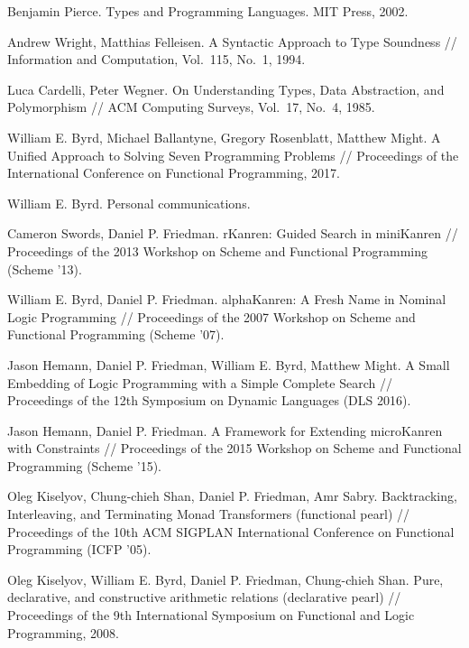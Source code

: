 \documentclass{llncs}
\begin{document}
\begin{thebibliography}{99}
Benjamin Pierce. Types and Programming Languages. MIT Press, 2002.

Andrew Wright, Matthias Felleisen. A Syntactic Approach to Type Soundness // Information and Computation, Vol.~115, No.~1, 1994.

Luca Cardelli, Peter Wegner. On Understanding Types, Data Abstraction, and Polymorphism // ACM Computing Surveys, Vol.~17, No.~4, 1985.

William E. Byrd, Michael Ballantyne, Gregory Rosenblatt, Matthew Might. A Unified Approach to Solving Seven Programming Problems // 
Proceedings of the International Conference on Functional Programming, 2017.

William E. Byrd. Personal communications.

Cameron Swords, Daniel P. Friedman. rKanren: Guided Search in miniKanren //
Proceedings of the 2013 Workshop on Scheme and Functional Programming (Scheme '13). 

William E. Byrd, Daniel P. Friedman. alphaKanren: A Fresh Name in Nominal Logic Programming //
Proceedings of the 2007 Workshop on Scheme and Functional Programming (Scheme '07).

Jason Hemann, Daniel P. Friedman, William E. Byrd, Matthew Might.
A Small Embedding of Logic Programming with a Simple Complete Search //
Proceedings of the 12th Symposium on Dynamic Languages (DLS 2016).

Jason Hemann, Daniel P. Friedman. A Framework for Extending microKanren with Constraints //
Proceedings of the 2015 Workshop on Scheme and Functional Programming (Scheme '15).

Oleg Kiselyov, Chung-chieh Shan, Daniel P. Friedman, Amr Sabry. Backtracking, Interleaving, and Terminating Monad Transformers (functional pearl) //
Proceedings of the 10th ACM SIGPLAN International Conference on Functional Programming (ICFP '05).

Oleg Kiselyov, William E. Byrd, Daniel P. Friedman, Chung-chieh Shan.
Pure, declarative, and constructive arithmetic relations (declarative pearl) //
Proceedings of the 9th International Symposium on Functional and Logic Programming, 2008.

\end{thebibliography}

\clearpage
\appendix

\end{document}
